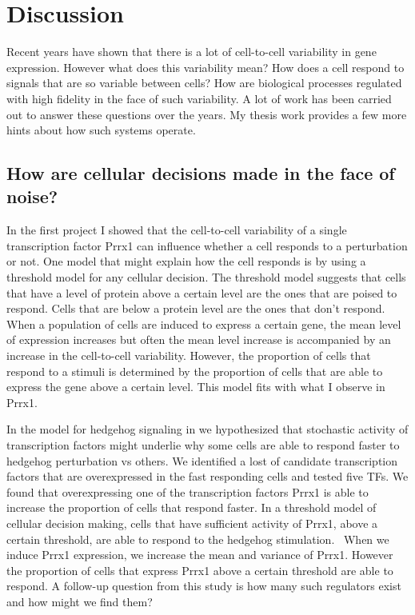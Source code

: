 \chapter{Discussion}
\label{chap:conclusion}
\tightlists

Recent years have shown that there is a lot of cell-to-cell variability in gene expression. However what does this variability mean? How does a cell respond to signals that are so variable between cells? How are biological processes regulated with high fidelity in the face of such variability. A lot of work has been carried out to answer these questions over the years. My thesis work provides a few more hints about how such systems operate.

\section{How are cellular decisions made in the face of noise?}

In the first project I showed that the cell-to-cell variability of a single transcription factor Prrx1 can influence whether a cell responds to a perturbation or not. One model that might explain how the cell responds is by using a threshold model for any cellular decision. The threshold model suggests that cells that have a level of protein above a certain level are the ones that are poised to respond. Cells that are below a protein level are the ones that don't respond. When a population of cells are induced to express a certain gene, the mean level of expression increases but often the mean level increase is accompanied by an increase in the cell-to-cell variability. However, the proportion of cells that respond to a stimuli is determined by the proportion of cells that are able to express the gene above a certain level. This model fits with what I observe in Prrx1.

In the model for hedgehog signaling in \label{Chap:hedgehog} we hypothesized that stochastic activity of transcription factors might underlie why some cells are able to respond faster to hedgehog perturbation vs others. We identified a lost of candidate transcription factors that are overexpressed in the fast responding cells and tested five TFs. We found that overexpressing one of the transcription factors Prrx1 is able to increase the proportion of cells that respond faster. In a threshold model of cellular decision making, cells that have sufficient activity of Prrx1, above a certain threshold, are able to respond to the hedgehog stimulation.  When we induce Prrx1 expression, we increase the mean and variance of Prrx1. However the proportion of cells that express Prrx1 above a certain threshold are able to respond. A follow-up question from this study is how many such regulators exist and how might we find them?

